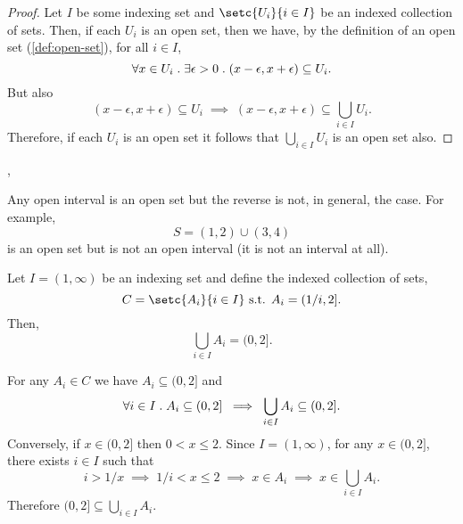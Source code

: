 \documentclass[../MathsNotesBase.tex]{subfiles}
\begin{document}
{		
	
	
	
		\nl[12]
		\begin{proof}
			Let $I$ be some indexing set and ${ \setc{U_i}{i \in I} }$ be an indexed collection of sets. Then, if each $U_i$ is an open set, then we have, by the definition of an open set (\ref{def:open-set}), for all ${ i \in I }$,
			\[ \forall x \in U_i \;.\; \exists \epsilon > 0 \;.\; (x - \epsilon, x + \epsilon) \subseteq U_i. \]
			But also
			\[ (x - \epsilon, x + \epsilon) \subseteq U_i \; \implies \; (x - \epsilon, x + \epsilon) \subseteq \bigcup_{i \in I} U_i. \]
			Therefore, if each $U_i$ is an open set it follows that $\bigcup_{i \in I} U_i$ is an open set also.
		\end{proof}
	
		
		\nl[6]
		\sep
		\begin{exe}
			\ex Any open interval is an open set but the reverse is not, in general, the case. For example,
			\[ S = (1,2) \cup (3,4) \]
			is an open set but is not an open interval (it is not an interval at all).
			
			\bigskip
			\ex Let ${ I = (1,\infty) }$ be an indexing set and define the indexed collection of sets,
			\[ C = \setc{A_i}{i \in I} \suchthat A_i = (1/i, 2]. \]
			Then,
			\[ \bigcup_{i \in I} A_i = (0, 2]. \]
			
			\nl[12]
			For any ${ A_i \in C }$ we have ${ A_i \subseteq (0, 2] }$ and
			\[ \forall i \in I \;.\; A_i \subseteq (0, 2] \; \implies \; \bigcup_{i \in I} A_i \subseteq (0, 2]. \]
			Conversely, if ${ x \in (0, 2] }$ then ${ 0 < x \leq 2 }$. Since ${ I = (1,\infty) }$, for any ${ x \in (0, 2] }$, there exists ${ i \in I }$ such that
			\[ i > 1/x \; \implies \; 1/i < x \leq 2 \; \implies \; x \in A_i \; \implies \; x \in \bigcup_{i \in I} A_i. \]
			Therefore ${ (0, 2] \subseteq \bigcup_{i \in I} A_i }$.
		\end{exe}
	}
\end{document}

